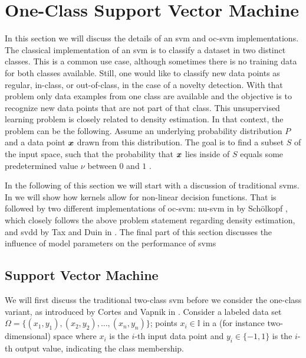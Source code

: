 \section{One-Class Support Vector Machine}\label{sec:one_class_svm}
In this section we will discuss the details of an \gls{svm} and \gls{oc-svm} implementations.
The classical implementation of an \gls{svm} is to classify a dataset in two distinct classes.
This is a common use case, although sometimes there is no training data for both classes available.
Still, one would like to classify new data points as regular, in-class, or out-of-class, \eg in the case of a novelty detection.
With that problem only data examples from one class are available and the objective is to recognize new data points that are not part of that class.
This unsupervised learning problem is closely related to density estimation.
In that context, the problem can be the following.
Assume an underlying probability distribution $P$ and a data point $\vectorsym{x}$ drawn from this distribution.
The goal is to find a subset $S$ of the input space, such that the probability that $\vectorsym{x}$ lies inside of $S$ equals some predetermined value $\nu$ between $0$ and $1$ \cite{scholkopf1999support}.

In the following of this section we will start with a discussion of traditional \glspl{svm}.
In  we will show how kernels allow for non-linear decision functions.
That is followed by two different implementations of \gls{oc-svm}: \gls{nu-svm} in  by Sch\"olkopf \etal \cite{scholkopf1999support}, which closely follows the above problem statement regarding density estimation, and \gls{svdd} by Tax and Duin \cite{tax1999support} in .
The final part of this section discusses the influence of model parameters on the performance of \glspl{svm}

\subsection{Support Vector Machine}\label{subsec:svm}
We will first discuss the traditional two-class \gls{svm} before we consider the one-class variant, as introduced by Cortes and Vapnik in \cite{cortes1995support}.
Consider a labeled data set $\Omega = \{ (x_1, y_1),\allowbreak (x_2, y_2), \dots , (x_n, y_n) \}$; points $x_i \in \mathbb{I}$ in a (for instance two-dimensional) space where $x_i$ is the $i$-th input data point and $y_i \in \{-1, 1\}$ is the $i$-th output value, indicating the class membership.


